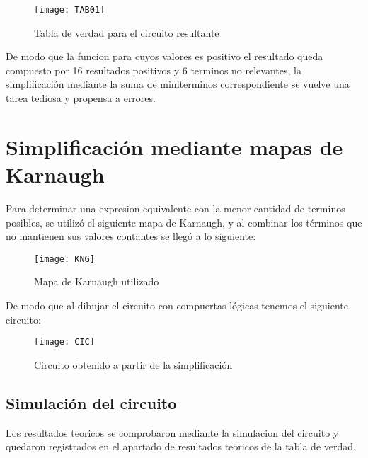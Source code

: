 \documentclass[a4paper,12pt]{article}
\begin{document}
\vspace{1cm}

\begin{figure}[ht!]
	\centering

	\texttt{[image: TAB01]}

	\caption{Tabla de verdad para el circuito resultante}
\end{figure}

De modo que la funcion para cuyos valores es positivo el resultado queda compuesto por 16 resultados positivos y 6 terminos no relevantes, la simplificación mediante la suma de miniterminos correspondiente se vuelve una tarea tediosa y propensa a errores.\par

\newpage

\section{Simplificación mediante mapas de Karnaugh}

Para determinar una expresion equivalente con la menor cantidad de terminos posibles, se utilizó el siguiente mapa de Karnaugh, y al combinar los términos que no mantienen sus valores contantes se llegó a lo siguiente:\\

\begin{figure}[ht!]
	\centering

	\texttt{[image: KNG]}

	\caption{Mapa de Karnaugh utilizado}
\end{figure}

De modo que al dibujar el circuito con compuertas lógicas tenemos el siguiente circuito:

\begin{figure}[ht!]
	\centering

	\texttt{[image: CIC]}

	\caption{Circuito obtenido a partir de la simplificación}
\end{figure}


\subsection{Simulación del circuito}

Los resultados teoricos se comprobaron mediante la simulacion del circuito y quedaron registrados en el apartado de resultados teoricos de la tabla de verdad.\\
\end{document}
